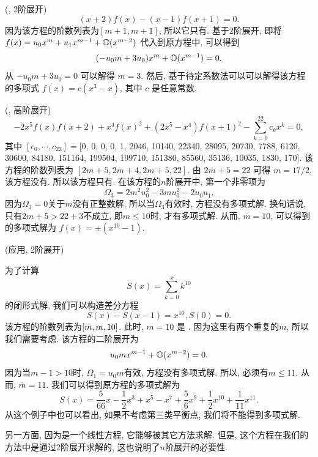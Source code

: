 \begin{example} \label{examp-3}
(\BPthree{}, 2阶展开)
\begin{equation}
(x+2)f(x)-(x-1)f(x+1)=0. \label{ep3}
\end{equation}
因为该方程的阶数列表为$[m+1,m+1]$, 所以它只有\BPthree{}. 基于2阶展开, 即将$f(x)=u_0 x^m + u_1 x^{m-1} + \mathbb O(x^{m-2})$ 代入到原方程中, 可以得到
\begin{equation}
(-u_0 m+3u_0)x^m+\mathbb O(x^{m-1})=0.
\end{equation}
从 $-u_0 m+3u_0=0$ 可以解得 $m=3$. 然后, 基于待定系数法可以可以解得该方程的多项式 $f(x)=c(x^3-x)$, 其中 $c$ 是任意常数.
\end{example}

\begin{example}
(\BPthree{}, 高阶展开)
\begin{equation}
-2x^5f(x)f(x+2)+x^4f(x)^2+(2x^5-x^4)f(x+1)^2-\sum_{k=0}^{22}{c_k x^k}=0, \label{ep4}
\end{equation}
其中 $[c_0,\cdots,c_{22}]=$[0, 0, 0, 0, 1, 2046, 10140, 22340, 28095, 20730, 7788, 6120, 30600, 84180, 151164, 199504, 199710, 151380, 85560, 35136, 10035, 1830, 170]. 该方程的阶数列表为 $[2m+5,2m+4,2m+5,22]$. 由 $2m+5=22$ 可得 $ m=17/2$, 该方程没有\BPone{}. 所以该方程只有\BPthree{}. 在该方程的$n$阶展开中, 第一个非零项为 
\begin{equation}
\Omega_3 = 2m^2u_0^2-3mu_0^2-2u_0u_1.
\end{equation}
因为$\Omega_3=0$关于$m$没有正整数解, 所以当$\Omega_3$有效时, 方程没有多项式解. 换句话说, 只有$2m+5>22+3$不成立, 即$m\le 10$时, 才有多项式解. 从而, $\overline m =10$, 可以得到 的多项式解为 $f(x)=\pm (x^{10}-1)$.
\end{example}

\begin{example}
(应用, 2阶展开)

为了计算 
\begin{equation}
    S(x)=\sum_{k=0}^x{k^{10}}
\end{equation}
的闭形式解, 我们可以构造差分方程
\begin{equation}
    S(x)-S(x-1)=x^{10}, S(0)=0. \label{seq}
\end{equation}
该方程的阶数列表为$\left[m,m,10\right]$. 此时, $m=10$ 是 \BPone{}. 因为这里有两个重复的$m$, 所以我们需要考虑\BPthree{}. 该方程的二阶展开为
\begin{equation}
u_0m x^{m-1}+\mathbb O(x^{m-2})=0.   
\end{equation}
因为当$m-1>10$时, $\Omega_1=u_0m$有效, 方程没有多项式解. 所以, 必须有$m\le 11$. 从而, $\overline m=11$. 我们可以得到原方程的多项式解为
\begin{equation}
S(x)=\frac{5}{66}x-\frac{1}{2}x^3+x^5-x^7+\frac{5}{6}x^9+\frac{1}{2}x^{10}+\frac{1}{11}x^{11}.
\end{equation}
从这个例子中也可以看出, 如果不考虑第三类平衡点, 我们将不能得到多项式解. 

另一方面, 因为是一个线性方程, 它能够被其它方法\cite{Abramov1989polynomial,Abramov1995polynomial}求解. 但是, 这个方程在我们的方法中是通过2阶展开求解的, 这也说明了$n$阶展开的必要性. 
\end{example}

